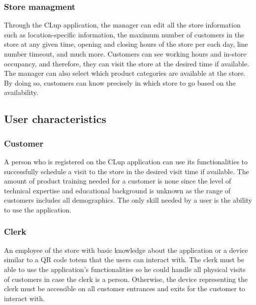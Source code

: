 \subsubsection {Store managment}
Through the CLup application, the manager can edit all the store information such as location-specific information, the maximum number of customers in the store at any given time, opening and closing hours of the store per each day, line number timeout, and much more.
Customers can see working hours and in-store occupancy, and therefore, they can visit the store at the desired time if available.
The manager can also select which product categories are available at the store.
By doing so, customers can know precisely in which store to go based on the availability.

\subsection{User characteristics}


\subsubsection {Customer}
A person who is registered on the CLup application can use its functionalities to successfully schedule a visit to the store in the desired visit time if available.
The amount of product training needed for a customer is none since the level of technical expertise and educational background is unknown as the range of customers includes all demographics.
The only skill needed by a user is the ability to use the application.


\subsubsection {Clerk}
An employee of the store with basic knowledge about the application or a device similar to a QR code totem that the users can interact with.
The clerk must be able to use the application's functionalities so he could handle all physical visits of customers in case the clerk is a person.
Otherwise, the device representing the clerk must be accessible on all customer entrances and exits for the customer to interact with.

